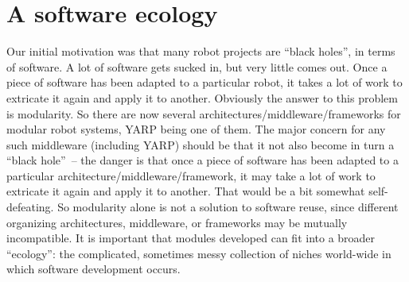 
\section{A software ecology}



%
Our initial motivation was that
many robot projects are ``black holes'', in terms of software.  A lot
of software gets sucked in, but very little comes out.  Once a piece
of software has been adapted to a particular robot, it takes a lot
of work to extricate it again and apply it to another.
%
Obviously the answer to this problem is modularity.  So there are 
now several architectures/middleware/frameworks for modular robot systems,
YARP being one of them.
The major concern for any such middleware (including YARP) should be that it not 
also become
in turn a ``black hole''~-- the
danger is that once a piece of software has been adapted
to a particular architecture/middleware/framework, it may take a lot of work to extricate it
again and apply it to another.  That would be a bit somewhat self-defeating.
%
So modularity alone is not a solution to software reuse, since 
different organizing architectures, middleware, or frameworks may be mutually
incompatible.  It is important that modules developed can fit
into a broader ``ecology'': the  complicated, sometimes messy
collection of niches world-wide in which software development occurs.







